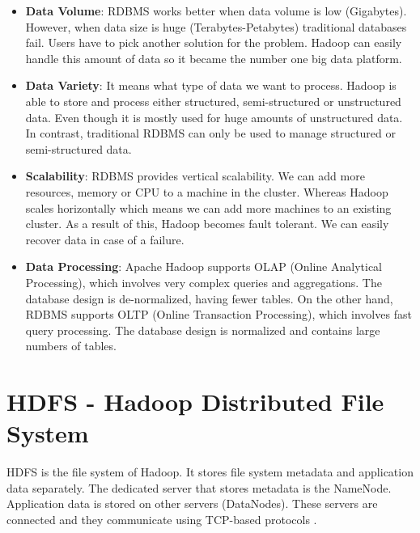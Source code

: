 \begin{itemize}
	\item \textbf{Data Volume}: RDBMS works better when data volume is low (Gigabytes). However, when data size is huge (Terabytes-Petabytes) traditional databases fail. Users have to pick another solution for the problem. Hadoop can easily handle this amount of data so it became the number one big data platform.
	\item \textbf{Data Variety}: It means what type of data we want to process. Hadoop is able to store and process either structured, semi-structured or unstructured data. Even though  it is mostly used for huge amounts of unstructured data. 
	In contrast, traditional RDBMS can only be used to manage structured or semi-structured data. 
	\item \textbf{Scalability}: RDBMS provides vertical scalability. We can add more resources, memory or CPU to a machine in the cluster. Whereas Hadoop scales horizontally which means we can add more machines to an existing cluster. As a result of this, Hadoop becomes fault tolerant. We can easily recover data in case of a failure.
	\item \textbf{Data Processing}: Apache Hadoop supports OLAP (Online Analytical Processing), which involves very complex queries and aggregations. The database design is de-normalized, having fewer tables. On the other hand, RDBMS supports OLTP (Online Transaction Processing), which involves fast query processing. The database design is normalized and contains large numbers of tables.
\end{itemize}\fi

\section{HDFS - Hadoop Distributed File System}
HDFS is the file system of Hadoop. It stores file system metadata and application data separately. The dedicated server that stores metadata is the NameNode. Application data is stored on other servers (DataNodes). These servers are connected and they communicate using TCP-based protocols \cite{Shvachko:2010:HDF:1913798.1914427}. 

